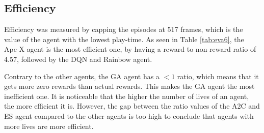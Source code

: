 \subsection{Efficiency}
Efficiency was measured by capping the episodes at 517 frames, which is the value of the agent with the lowest play-time. As seen in Table \ref{tab:eva6}, the Ape-X agent is the most efficient one, by having a reward to non-reward ratio of 4.57, followed by the DQN and Rainbow agent.
\begin{table}[H]
	\caption[Average results of agents in approximately 517 frames] {Average results of agents in approximately 517 frames}
	\centering
	\label{tab:eva6}
\end{table} 
Contrary to the other agents, the GA agent has a $<1$ ratio, which means that it gets more zero rewards than actual rewards. This makes the GA agent the most inefficient one. It is noticeable that the higher the number of lives of an agent, the more efficient it is. However, the gap between the ratio values of the A2C and ES agent compared to the other agents is too high to conclude that agents with more lives are more efficient.


